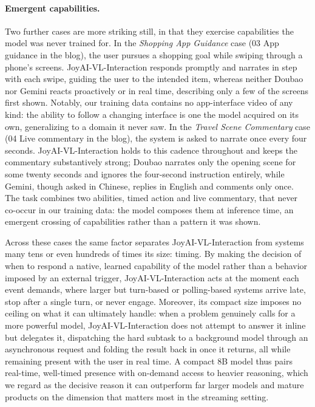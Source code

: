 \documentclass{llmxive}
\begin{document}
\paragraph{\textbf{Emergent capabilities.}}
Two further cases are more striking still, in that they exercise capabilities the model was never trained for. In the \textit{Shopping App Guidance} case (03 App guidance in the blog), the user pursues a shopping goal while swiping through a phone's screens. JoyAI-VL-Interaction responds promptly and narrates in step with each swipe, guiding the user to the intended item, whereas neither Doubao nor Gemini reacts proactively or in real time, describing only a few of the screens first shown. Notably, our training data contains no app-interface video of any kind: the ability to follow a changing interface is one the model acquired on its own, generalizing to a domain it never saw.
In the \textit{Travel Scene Commentary} case (04 Live commentary in the blog), the system is asked to narrate once every four seconds. JoyAI-VL-Interaction holds to this cadence throughout and keeps the commentary substantively strong; Doubao narrates only the opening scene for some twenty seconds and ignores the four-second instruction entirely, while Gemini, though asked in Chinese, replies in English and comments only once. The task combines two abilities, timed action and live commentary, that never co-occur in our training data: the model composes them at inference time, an emergent crossing of capabilities rather than a pattern it was shown.

Across these cases the same factor separates JoyAI-VL-Interaction from systems many tens or even hundreds of times its size: timing. By making the decision of when to respond a native, learned capability of the model rather than a behavior imposed by an external trigger, JoyAI-VL-Interaction acts at the moment each event demands, where larger but turn-based or polling-based systems arrive late, stop after a single turn, or never engage. Moreover, its compact size imposes no ceiling on what it can ultimately handle: when a problem genuinely calls for a more powerful model, JoyAI-VL-Interaction does not attempt to answer it inline but delegates it, dispatching the hard subtask to a background model through an asynchronous request and folding the result back in once it returns, all while remaining present with the user in real time. A compact 8B model thus pairs real-time, well-timed presence with on-demand access to heavier reasoning, which we regard as the decisive reason it can outperform far larger models and mature products on the dimension that matters most in the streaming setting.
\end{document}

